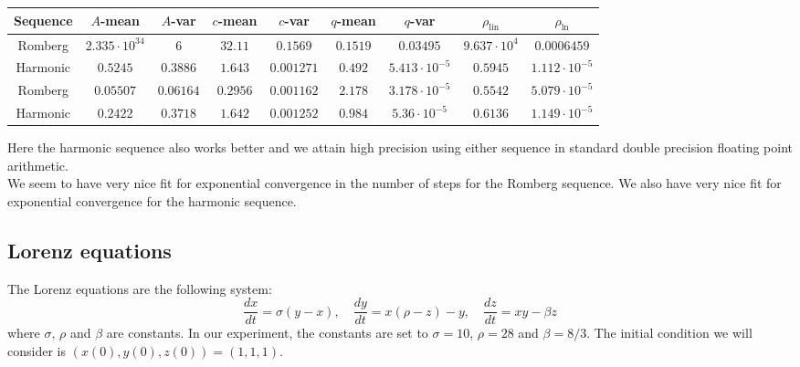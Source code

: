 \begin{table}[H]
    \centering
    \small
    \begin{tabular}{c||c|c|c|c|c|c|c|c}
Sequence & \(A\)-mean & \(A\)-var & \(c\)-mean & \(c\)-var & \(q\)-mean & \(q\)-var & \(\rho_{\operatorname{lin}}\) & \(\rho_{\ln}\)\\\hline
\rowcolor{red}
Romberg & \(2.335\cdot 10^{34}\) & \(6\) & \(32.11\) & \(0.1569\) & \(0.1519\) & \(0.03495\) & \(9.637\cdot 10^4\) & \(0.0006459\) \\
\rowcolor{green}
Harmonic & \(0.5245\) & \(0.3886\) & \(1.643\) & \(0.001271\) & \(0.492\) & \(5.413\cdot 10^{-5}\) & \(0.5945\) & \(1.112\cdot 10^{-5}\) \\
\rowcolor{green}
Romberg & \(0.05507\) & \(0.06164\) & \(0.2956\) & \(0.001162\) & \(2.178\) & \(3.178\cdot 10^{-5}\) & \(0.5542\) & \(5.079\cdot 10^{-5}\) \\
\rowcolor{green}
Harmonic & \(0.2422\) & \(0.3718\) & \(1.642\) & \(0.001252\) & \(0.984\) & \(5.36\cdot 10^{-5}\) & \(0.6136\) & \(1.149\cdot 10^{-5}\) \\
    \end{tabular}
    \label{tab:my_label}
\end{table}

Here the harmonic sequence also works better and we attain high precision using either sequence in standard double precision floating point arithmetic.\\

We seem to have very nice fit for exponential convergence in the number of steps for the Romberg sequence. We also have very nice fit for exponential convergence for the harmonic sequence.

\subsection{Lorenz equations}

The Lorenz equations are the following system: 
\[
\frac{dx}{dt} = \sigma (y-x),\quad \frac{dy}{dt} = x(\rho - z) - y,\quad \frac{dz}{dt} = xy - \beta z
\]
where \(\sigma,\,\rho\) and \(\beta\) are constants. In our experiment, the constants are set to \(\sigma = 10\), \(\rho = 28\) and \(\beta = 8/3\). The initial condition we will consider is \((x(0),y(0),z(0)) = (1,1,1)\).\\

